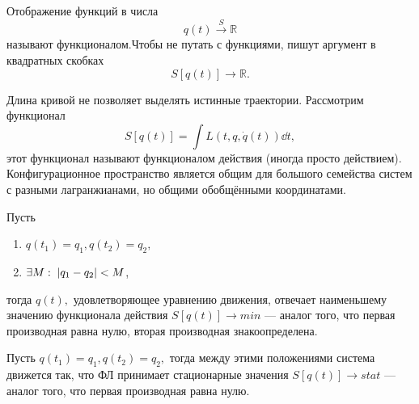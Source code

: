 Отображение функций в числа \[q(t) \stackrel{S}{\rightarrow} \mathbb{R}\] называют функционалом.Чтобы не путать с функциями, пишут аргумент в квадратных скобках
\[S[q(t)] \rightarrow \mathbb{R}.\]

Длина кривой не позволяет выделять истинные траектории. Рассмотрим функционал
\begin{equation}
 \boxed{S[q(t)] = \int\limits L(t, q, \dot{q}(t)) \dd{t}}, \label{deystv}
 \end{equation}
 этот функционал называют функционалом  действия (иногда просто действием). Конфигурационное пространство является общим для большого семейства систем с разными лагранжианами, но общими обобщёнными координатами.
 
 \begin{pst}
 Пусть
 \begin{enumerate}
 \item $q(t_1) = q_1, q(t_2) = q_2,$
 \item $\exists M:\; \abs{q_1 - q_2} < M$, 
 \end{enumerate}
 тогда $q(t),$ удовлетворяющее уравнению движения, отвечает наименьшему значению функционала действия $S[q(t)] \rightarrow min$ --- аналог того, что первая производная равна нулю, вторая производная знакоопределена. 
 \end{pst}
 
 \begin{pst}
 Пусть $q(t_1) = q_1, q(t_2) = q_2,$ тогда между этими положениями система движется так, что ФЛ принимает стационарные значения $S[q(t)] \rightarrow stat$ --- аналог того, что первая производная равна нулю.
 \end{pst}

